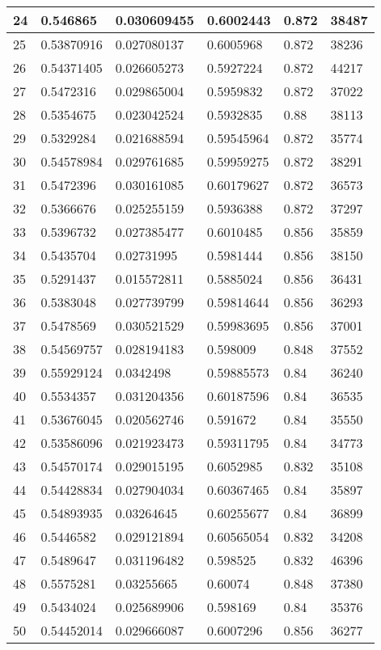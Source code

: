 \begin{longtable}{|l|l|l|l|l|l|}
24 & 0.546865 & 0.030609455 & 0.6002443 & 0.872 & 38487 \\ \hline 
25 & 0.53870916 & 0.027080137 & 0.6005968 & 0.872 & 38236 \\ \hline 
26 & 0.54371405 & 0.026605273 & 0.5927224 & 0.872 & 44217 \\ \hline 
27 & 0.5472316 & 0.029865004 & 0.5959832 & 0.872 & 37022 \\ \hline 
28 & 0.5354675 & 0.023042524 & 0.5932835 & 0.88 & 38113 \\ \hline 
29 & 0.5329284 & 0.021688594 & 0.59545964 & 0.872 & 35774 \\ \hline 
30 & 0.54578984 & 0.029761685 & 0.59959275 & 0.872 & 38291 \\ \hline 
31 & 0.5472396 & 0.030161085 & 0.60179627 & 0.872 & 36573 \\ \hline 
32 & 0.5366676 & 0.025255159 & 0.5936388 & 0.872 & 37297 \\ \hline 
33 & 0.5396732 & 0.027385477 & 0.6010485 & 0.856 & 35859 \\ \hline 
34 & 0.5435704 & 0.02731995 & 0.5981444 & 0.856 & 38150 \\ \hline 
35 & 0.5291437 & 0.015572811 & 0.5885024 & 0.856 & 36431 \\ \hline 
36 & 0.5383048 & 0.027739799 & 0.59814644 & 0.856 & 36293 \\ \hline 
37 & 0.5478569 & 0.030521529 & 0.59983695 & 0.856 & 37001 \\ \hline 
38 & 0.54569757 & 0.028194183 & 0.598009 & 0.848 & 37552 \\ \hline 
39 & 0.55929124 & 0.0342498 & 0.59885573 & 0.84 & 36240 \\ \hline 
40 & 0.5534357 & 0.031204356 & 0.60187596 & 0.84 & 36535 \\ \hline 
41 & 0.53676045 & 0.020562746 & 0.591672 & 0.84 & 35550 \\ \hline 
42 & 0.53586096 & 0.021923473 & 0.59311795 & 0.84 & 34773 \\ \hline 
43 & 0.54570174 & 0.029015195 & 0.6052985 & 0.832 & 35108 \\ \hline 
44 & 0.54428834 & 0.027904034 & 0.60367465 & 0.84 & 35897 \\ \hline 
45 & 0.54893935 & 0.03264645 & 0.60255677 & 0.84 & 36899 \\ \hline 
46 & 0.5446582 & 0.029121894 & 0.60565054 & 0.832 & 34208 \\ \hline 
47 & 0.5489647 & 0.031196482 & 0.598525 & 0.832 & 46396 \\ \hline 
48 & 0.5575281 & 0.03255665 & 0.60074 & 0.848 & 37380 \\ \hline 
49 & 0.5434024 & 0.025689906 & 0.598169 & 0.84 & 35376 \\ \hline 
50 & 0.54452014 & 0.029666087 & 0.6007296 & 0.856 & 36277 \\ \hline 
\end{longtable}